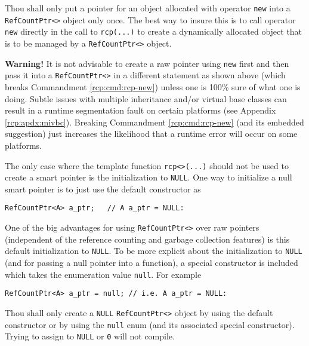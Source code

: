 \begin{commandment}\label{rcp:cmd:rcp-new}
Thou shall only put a pointer for an object allocated with operator
{}\texttt{new} into a {}\texttt{RefCountPtr<>} object only once.  The
best way to insure this is to call operator {}\texttt{new} directly in
the call to {}\texttt{rcp(...)} to create a dynamically allocated
object that is to be managed by a {}\texttt{RefCountPtr<>} object.
\end{commandment}


{}\textbf{Warning!} It is not advisable to create a raw pointer using
{}\texttt{new} first and then pass it into a {}\texttt{RefCountPtr<>}
in a different statement as shown above (which breaks Commandment
{}\ref{rcp:cmd:rcp-new}) unless one is 100\% sure of what one is
doing.  Subtle issues with multiple inheritance and/or virtual base
classes can result in a runtime segmentation fault on certain
platforms (see Appendix {}\ref{rcp:apdx:mivbc}).  Breaking Commandment
{}\ref{rcp:cmd:rcp-new} (and its embedded suggestion) just increases
the likelihood that a runtime error will occur on some platforms.

The only case where the template function {}\texttt{rcp<>(...)} should
not be used to create a smart pointer is the initialization to
{}\texttt{NULL}.  One way to initialize a null smart pointer is to just
use the default constructor as

{\scriptsize\begin{verbatim}
RefCountPtr<A> a_ptr;   // A a_ptr = NULL:
\end{verbatim}}

One of the big advantages for using {}\texttt{RefCountPtr<>} over raw
pointers (independent of the reference counting and garbage collection
features) is this default initialization to {}\texttt{NULL}.  To be
more explicit about the initialization to {}\texttt{NULL} (and for
passing a null pointer into a function), a special constructor is
included which takes the enumeration value {}\texttt{null}.  For
example

{\scriptsize\begin{verbatim}
RefCountPtr<A> a_ptr = null; // i.e. A a_ptr = NULL:
\end{verbatim}}

\begin{commandment}
Thou shall only create a {}\texttt{NULL} {}\texttt{RefCountPtr<>}
object by using the default constructor or by using the
{}\texttt{null} enum (and its associated special constructor).  Trying
to assign to {}\texttt{NULL} or {}\texttt{0} will not compile.
\end{commandment}

